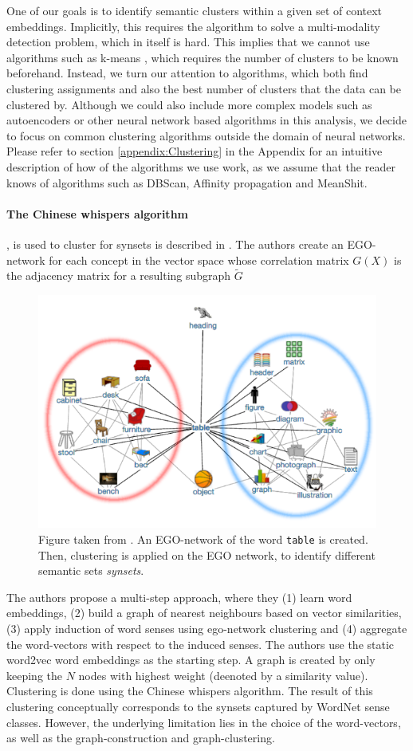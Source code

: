 \documentclass[a4paper,12pt,twoside,openright]{report}
\begin{document}
One of our goals is to identify semantic clusters within a given set of context embeddings.
Implicitly, this requires the algorithm to solve a multi-modality detection problem, which in itself is hard.
This implies that we cannot use algorithms such as k-means \cite{lloyd57, macqueen67}, which requires the number of clusters to be known beforehand.
Instead, we turn our attention to algorithms, which both find clustering assignments and also the best number of clusters that the data can be clustered by.
Although we could also include more complex models such as autoencoders or other neural network based algorithms in this analysis, we decide to focus on common clustering algorithms outside the domain of neural networks.
Please refer to section \ref{appendix:Clustering} in the Appendix for an intuitive description of how of the algorithms we use work, as we assume that the reader knows of algorithms such as DBScan, Affinity propagation and MeanShit.

\paragraph{The Chinese whispers algorithm} , is used to cluster for synsets is described in \cite{pelevina16}.
The authors create an EGO-network for each concept in the vector space whose correlation matrix $G(X)$ is the adjacency matrix for a resulting subgraph $\tilde{G}$

\begin{figure}[h]
	\center
  \includegraphics[width=0.6\linewidth]{./assets/relatedwork/ego_network.png}
  \caption{Figure taken from \cite{pelevina16}. An EGO-network of the word \texttt{table} is created. Then, clustering is applied on the EGO network, to identify different semantic sets \textit{synsets}.}
  \label{fig:ego_network}
\end{figure}

The authors propose a multi-step approach, where they (1) learn word embeddings, (2) build a graph of nearest neighbours based on vector similarities, (3) apply induction of word senses using ego-network clustering and (4) aggregate the word-vectors with respect to the induced senses.
The authors use the static word2vec word embeddings as the starting step.
A graph is created by only keeping the $N$ nodes with highest weight (deenoted by a similarity value).
Clustering is done using the Chinese whispers algorithm.
The result of this clustering conceptually corresponds to the synsets captured by WordNet sense classes.
However, the underlying limitation lies in the choice of the word-vectors, as well as the graph-construction and graph-clustering.
\end{document}

